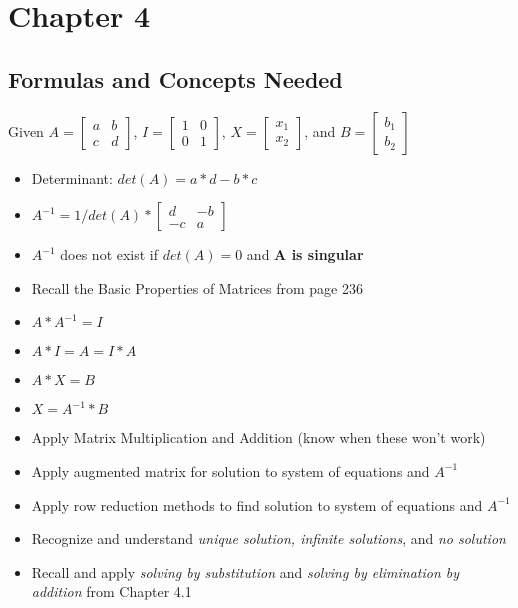 \documentclass[12pt]{article}
\begin{document}
\section*{Chapter 4}
\subsection*{Formulas  and Concepts Needed}
Given $A = \begin{bmatrix}
a & b \\
c & d
\end{bmatrix}$, $I = \begin{bmatrix}
1 & 0 \\
0 & 1
\end{bmatrix}$, $X = \begin{bmatrix}
x_1 \\
x_2
\end{bmatrix}$, and $B = \begin{bmatrix}
b_1 \\
b_2
\end{bmatrix}
$

\begin{itemize}
\item Determinant: $det(A) = a*d - b*c$
\item $A^{-1} = 1/det(A) * \begin{bmatrix}
d & -b \\
-c & a
\end{bmatrix}$
\item $A^{-1}$ does not exist if $det(A)=0$ and \textbf{A is singular}
\item Recall the Basic Properties of Matrices from page 236
\item $A * A^{-1} = I$
\item $A * I = A = I*A$
\item $A*X = B$
\item $X = A^{-1}*B$
\item Apply Matrix Multiplication and Addition (know when these won't work)
\item Apply augmented matrix for solution to system of equations and $A^{-1}$
\item Apply row reduction methods to find solution to system of equations and $A^{-1}$
\item Recognize and understand \textit{unique solution, infinite solutions}, and \textit{no solution}
\item Recall and apply \textit{solving by substitution} and \textit{solving by elimination by addition} from Chapter 4.1
\end{itemize}
\end{document}
